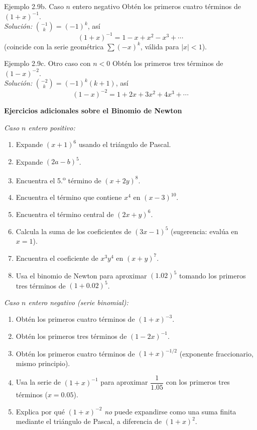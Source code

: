 \documentclass[12pt,letterpaper]{book}
\begin{document}
\begin{ejbox}{Ejemplo 2.9b. Caso $n$ entero negativo}
Obtén los primeros cuatro términos de $(1+x)^{-1}$.\\
\textit{Solución:} $\binom{-1}{k}=(-1)^k$, así
\[ (1+x)^{-1}=1-x+x^2-x^3+\cdots \]
(coincide con la serie geométrica $\sum(-x)^k$, válida para $|x|<1$).
\end{ejbox}

\begin{ejbox}{Ejemplo 2.9c. Otro caso con $n<0$}
Obtén los primeros tres términos de $(1-x)^{-2}$.\\
\textit{Solución:} $\binom{-2}{k}=(-1)^k(k+1)$, así
\[ (1-x)^{-2}=1+2x+3x^2+4x^3+\cdots \]
\end{ejbox}

\textbf{Ejercicios adicionales sobre el Binomio de Newton}

\textit{Caso $n$ entero positivo:}
\begin{enumerate}
\item Expande $(x+1)^6$ usando el triángulo de Pascal.
\item Expande $(2a-b)^5$.
\item Encuentra el 5.\textsuperscript{o} término de $(x+2y)^8$.
\item Encuentra el término que contiene $x^4$ en $(x-3)^{10}$.
\item Encuentra el término central de $(2x+y)^6$.
\item Calcula la suma de los coeficientes de $(3x-1)^5$ (sugerencia: evalúa en $x=1$).
\item Encuentra el coeficiente de $x^3y^4$ en $(x+y)^7$.
\item Usa el binomio de Newton para aproximar $(1.02)^5$ tomando los primeros tres términos de $(1+0.02)^5$.
\end{enumerate}

\textit{Caso $n$ entero negativo (serie binomial):}
\begin{enumerate}
\item Obtén los primeros cuatro términos de $(1+x)^{-3}$.
\item Obtén los primeros tres términos de $(1-2x)^{-1}$.
\item Obtén los primeros cuatro términos de $(1+x)^{-1/2}$ (exponente fraccionario, mismo principio).
\item Usa la serie de $(1+x)^{-1}$ para aproximar $\dfrac{1}{1.05}$ con los primeros tres términos ($x=0.05$).
\item Explica por qué $(1+x)^{-2}$ \emph{no} puede expandirse como una suma finita mediante el triángulo de Pascal, a diferencia de $(1+x)^2$.
\end{enumerate}
\end{document}
